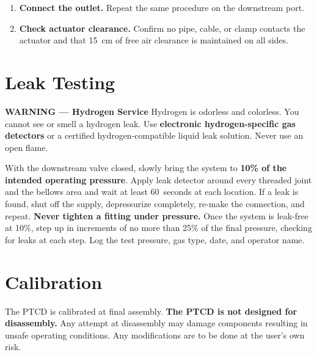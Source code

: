 \documentclass[12pt, letterpaper]{report}%
\begin{document}
\begin{appendices}
\begin{enumerate}[leftmargin=1.8em, itemsep=6pt]
		\item \textbf{Connect the outlet.} Repeat the same procedure on the downstream port.

		\item \textbf{Check actuator clearance.} Confirm no pipe, cable, or clamp contacts the actuator and that \SI{15}{\centi\meter} of free air clearance is maintained on all sides.

	\end{enumerate}

	\section{Leak Testing}
	\label{sec:leaktest}

\begin{warningbox}
\textbf{\textcolor{warnred}{WARNING --- Hydrogen Service}} \quad Hydrogen is odorless and colorless. You cannot see or smell a hydrogen leak. Use \textbf{electronic hydrogen-specific gas detectors} or a certified hydrogen-compatible liquid leak solution. Never use an open flame.
\end{warningbox}

	With the downstream valve closed, slowly bring the system to \textbf{10\% of the intended operating pressure}. Apply leak detector around every threaded joint and the bellows area and wait at least 60~seconds at each location. If a leak is found, shut off the supply, depressurize completely, re-make the connection, and repeat. \textbf{Never tighten a fitting under pressure.} Once the system is leak-free at 10\%, step up in increments of no more than 25\% of the final pressure, checking for leaks at each step. Log the test pressure, gas type, date, and operator name.

	\section{Calibration}

	The PTCD is calibrated at final assembly. \textbf{The PTCD is not designed for disassembly.} Any attempt at disassembly may damage components resulting in unsafe operating conditions. Any modifications are to be done at the user's own risk.




\end{appendices}
\end{document}
